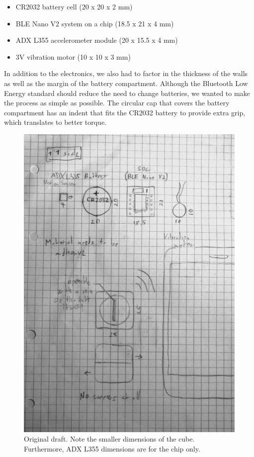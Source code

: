 \documentclass{article}
\begin{document}
\begin{itemize}
\item CR2032 battery cell (20 x 20 x 2 mm)
\item BLE Nano V2 system on a chip (18.5 x 21 x 4 mm)
\item ADX L355 accelerometer module (20 x 15.5 x 4 mm)
\item 3V vibration motor (10 x 10 x 3 mm)
\end{itemize}

In addition to the electronics, we also had to factor in the thickness of the walls as well as the margin of the battery compartment. Although the Bluetooth Low Energy standard should reduce the need to change batteries, we wanted to make the process as simple as possible. The circular cap that covers the battery compartment has an indent that fits the CR2032 battery to provide extra grip, which translates to better torque.

\newpage

\begin{figure}[H]
\centering
\includegraphics[scale=2.25]{draft.jpg}
\caption{Original draft. Note the smaller dimensions of the cube. Furthermore, ADX L355 dimensions are for the chip only.}
\label{fig:draft}
\end{figure}
\end{document}
